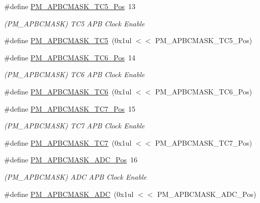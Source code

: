 \begin{DoxyCompactItemize}
\item 
\#define \mbox{\hyperlink{group___s_a_m_d21___p_m_gaf3dec60591427af14cafa0bda8db17f6}{P\+M\+\_\+\+A\+P\+B\+C\+M\+A\+S\+K\+\_\+\+T\+C5\+\_\+\+Pos}}~13
\begin{DoxyCompactList}\small\item\em (P\+M\+\_\+\+A\+P\+B\+C\+M\+A\+SK) T\+C5 A\+PB Clock Enable \end{DoxyCompactList}\item 
\#define \mbox{\hyperlink{group___s_a_m_d21___p_m_gaf0843ef872a543735acd89109b5ccd44}{P\+M\+\_\+\+A\+P\+B\+C\+M\+A\+S\+K\+\_\+\+T\+C5}}~(0x1ul $<$$<$ P\+M\+\_\+\+A\+P\+B\+C\+M\+A\+S\+K\+\_\+\+T\+C5\+\_\+\+Pos)
\item 
\#define \mbox{\hyperlink{group___s_a_m_d21___p_m_gac027faf083cc78dd4ebe67459a5f4214}{P\+M\+\_\+\+A\+P\+B\+C\+M\+A\+S\+K\+\_\+\+T\+C6\+\_\+\+Pos}}~14
\begin{DoxyCompactList}\small\item\em (P\+M\+\_\+\+A\+P\+B\+C\+M\+A\+SK) T\+C6 A\+PB Clock Enable \end{DoxyCompactList}\item 
\#define \mbox{\hyperlink{group___s_a_m_d21___p_m_gafe8e0feb72f20f5a09e0a0c5c9ba74da}{P\+M\+\_\+\+A\+P\+B\+C\+M\+A\+S\+K\+\_\+\+T\+C6}}~(0x1ul $<$$<$ P\+M\+\_\+\+A\+P\+B\+C\+M\+A\+S\+K\+\_\+\+T\+C6\+\_\+\+Pos)
\item 
\#define \mbox{\hyperlink{group___s_a_m_d21___p_m_gaf34876a97cacd9ecf9cb00f42ed05b4a}{P\+M\+\_\+\+A\+P\+B\+C\+M\+A\+S\+K\+\_\+\+T\+C7\+\_\+\+Pos}}~15
\begin{DoxyCompactList}\small\item\em (P\+M\+\_\+\+A\+P\+B\+C\+M\+A\+SK) T\+C7 A\+PB Clock Enable \end{DoxyCompactList}\item 
\#define \mbox{\hyperlink{group___s_a_m_d21___p_m_ga23813dadeb232bdeb23eb37b590c9550}{P\+M\+\_\+\+A\+P\+B\+C\+M\+A\+S\+K\+\_\+\+T\+C7}}~(0x1ul $<$$<$ P\+M\+\_\+\+A\+P\+B\+C\+M\+A\+S\+K\+\_\+\+T\+C7\+\_\+\+Pos)
\item 
\#define \mbox{\hyperlink{group___s_a_m_d21___p_m_ga8a6beb015784df10ef9ab5357e07e3b5}{P\+M\+\_\+\+A\+P\+B\+C\+M\+A\+S\+K\+\_\+\+A\+D\+C\+\_\+\+Pos}}~16
\begin{DoxyCompactList}\small\item\em (P\+M\+\_\+\+A\+P\+B\+C\+M\+A\+SK) A\+DC A\+PB Clock Enable \end{DoxyCompactList}\item 
\#define \mbox{\hyperlink{group___s_a_m_d21___p_m_gad2eca5e118cbd6a28e4128c3bc71f059}{P\+M\+\_\+\+A\+P\+B\+C\+M\+A\+S\+K\+\_\+\+A\+DC}}~(0x1ul $<$$<$ P\+M\+\_\+\+A\+P\+B\+C\+M\+A\+S\+K\+\_\+\+A\+D\+C\+\_\+\+Pos)

\end{DoxyCompactItemize}
